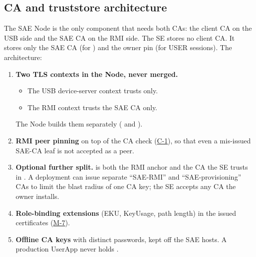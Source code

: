 \documentclass[11pt,a4paper]{article}
\begin{document}
\subsection{CA and truststore architecture}\label{sec:mit-ca}
The SAE Node is the only component that needs both CAs: the client CA on the USB side and the SAE CA on the RMI side. The SE stores no client CA. It stores only the SAE CA (for ) and the owner pin (for USER sessions). The architecture:
\begin{enumerate}
\item \textbf{Two TLS contexts in the Node, never merged.}
  \begin{itemize}
  \item The USB device-server context trusts  only.
  \item The RMI context trusts the SAE CA only.
  \end{itemize}
  The Node builds them separately ( and ).
\item \textbf{RMI peer pinning} on top of the CA check (\hyperref[c:C-1]{C-1}), so that even a mis-issued SAE-CA leaf is not accepted as a peer.
\item \textbf{Optional further split.}  is both the RMI anchor and the CA the SE trusts in . A deployment can issue separate ``SAE-RMI'' and ``SAE-provisioning'' CAs to limit the blast radius of one CA key; the SE accepts any CA the owner installs.
\item \textbf{Role-binding extensions} (EKU, KeyUsage, path length) in the issued certificates (\hyperref[m:M-7]{M-7}).
\item \textbf{Offline CA keys} with distinct passwords, kept off the SAE hosts. A production UserApp never holds .
\end{enumerate}
\end{document}
